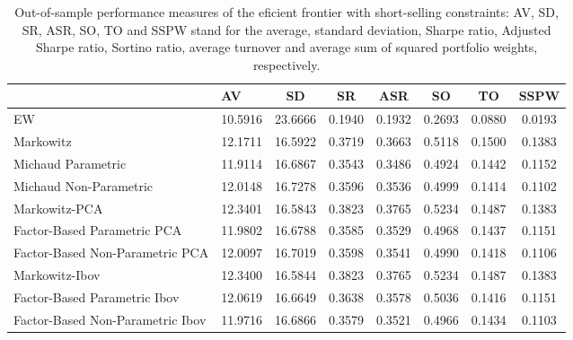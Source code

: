 \begin{table}

\caption{\label{tab:empirical_ef_2}Out-of-sample performance measures of the eficient frontier with short-selling constraints: AV, SD, SR, ASR, SO, TO and SSPW stand for the average, standard deviation, Sharpe ratio, Adjusted Sharpe ratio, Sortino ratio, average turnover and average sum of squared portfolio weights, respectively.}
\centering
\begin{tabular}[t]{l|l|c|c|c|c|c|c}
\hline
  & AV & SD & SR & ASR & SO & TO & SSPW\\
\hline
EW & 10.5916 & 23.6666 & 0.1940 & 0.1932 & 0.2693 & 0.0880 & 0.0193\\
\hline
Markowitz & 12.1711 & 16.5922 & 0.3719 & 0.3663 & 0.5118 & 0.1500 & 0.1383\\
\hline
Michaud Parametric & 11.9114 & 16.6867 & 0.3543 & 0.3486 & 0.4924 & 0.1442 & 0.1152\\
\hline
Michaud Non-Parametric & 12.0148 & 16.7278 & 0.3596 & 0.3536 & 0.4999 & 0.1414 & 0.1102\\
\hline
Markowitz-PCA & 12.3401 & 16.5843 & 0.3823 & 0.3765 & 0.5234 & 0.1487 & 0.1383\\
\hline
Factor-Based Parametric PCA & 11.9802 & 16.6788 & 0.3585 & 0.3529 & 0.4968 & 0.1437 & 0.1151\\
\hline
Factor-Based Non-Parametric PCA & 12.0097 & 16.7019 & 0.3598 & 0.3541 & 0.4990 & 0.1418 & 0.1106\\
\hline
Markowitz-Ibov & 12.3400 & 16.5844 & 0.3823 & 0.3765 & 0.5234 & 0.1487 & 0.1383\\
\hline
Factor-Based Parametric Ibov & 12.0619 & 16.6649 & 0.3638 & 0.3578 & 0.5036 & 0.1416 & 0.1151\\
\hline
Factor-Based Non-Parametric Ibov & 11.9716 & 16.6866 & 0.3579 & 0.3521 & 0.4966 & 0.1434 & 0.1103\\
\hline
\end{tabular}
\end{table}
